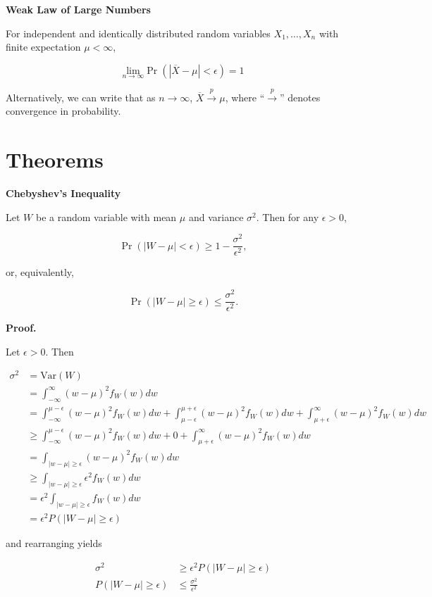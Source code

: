 \documentclass[
  letterpaper,
  DIV=11,
  numbers=noendperiod]{scrreprt}
\begin{document}
\textbf{Weak Law of Large Numbers}

For independent and identically distributed random variables
\(X_1, \dots, X_n\) with finite expectation \(\mu < \infty\),

\[
\underset{n \to \infty}{\text{lim}} \Pr(| \overline{X} - \mu | < \epsilon) = 1
\]

Alternatively, we can write that as \(n \to \infty\),
\(\overline{X} \overset{p}{\to} \mu\), where ``\(\overset{p}{\to}\)''
denotes convergence in probability.

\section{Theorems}\label{theorems-4}

\textbf{Chebyshev's Inequality}

Let \(W\) be a random variable with mean \(\mu\) and variance
\(\sigma^2\). Then for any \(\epsilon > 0\),

\[
\Pr(|W - \mu| < \epsilon) \geq 1 - \frac{\sigma^2}{\epsilon^2},
\]

or, equivalently,

\[
\Pr(|W - \mu| \geq \epsilon) \leq \frac{\sigma^2}{\epsilon^2}.
\]

\textbf{Proof.}

Let \(\epsilon > 0\). Then

\begin{align*}
\sigma^2 & = \text{Var}(W) \\
& = \int_{-\infty}^\infty (w-\mu)^2 f_W(w)dw \\
& = \int_{-\infty}^{\mu - \epsilon} (w-\mu)^2 f_W(w)dw + \int_{\mu - \epsilon}^{\mu + \epsilon} (w-\mu)^2 f_W(w)dw + \int_{\mu + \epsilon}^\infty (w-\mu)^2 f_W(w)dw \\
& \ge \int_{-\infty}^{\mu - \epsilon} (w-\mu)^2 f_W(w)dw + 0  + \int_{\mu + \epsilon}^\infty (w-\mu)^2 f_W(w)dw \\
&= \int_{|w-\mu|\ge \epsilon} (w-\mu)^2 f_W(w)dw \\
& \ge \int_{|w-\mu|\ge \epsilon} \epsilon^2 f_W(w)dw \\
& = \epsilon^2 \int_{|w-\mu|\ge \epsilon} f_W(w)dw\\
& = \epsilon^2 P(|W-\mu| \ge \epsilon)
\end{align*}

and rearranging yields

\begin{align*}
\sigma^2 & \geq \epsilon^2 P(|W-\mu| \ge \epsilon) \\
P(|W-\mu| \geq \epsilon) & \leq \frac{\sigma^2}{\epsilon^2}
\end{align*}
\end{document}
